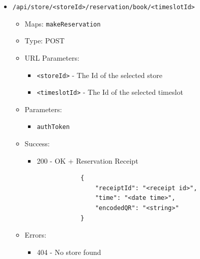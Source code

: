 \begin{itemize}
    \item \texttt{/api/store/<storeId>/reservation/book/<timeslotId>}
    \begin{itemize}
        \item Maps: \texttt{makeReservation}
        \item Type: POST
        \item URL Parameters:
        \begin{itemize}
            \item \texttt{<storeId>} - The Id of the selected store
            \item \texttt{<timeslotId>} - The Id of the selected timeslot
        \end{itemize}
        \item Parameters:
        \begin{itemize}
            \item \texttt{authToken}
        \end{itemize}
        \item Success:
        \begin{itemize}
            \item 200 - OK + Reservation Receipt
            \begin{lstlisting}
            {
                "receiptId": "<receipt id>",
                "time": "<date time>",
                "encodedQR": "<string>"
            }
            \end{lstlisting}
        \end{itemize}
        \item Errors:
        \begin{itemize}
            \item 404 - No store found
        \end{itemize}
    \end{itemize}


\end{itemize}
